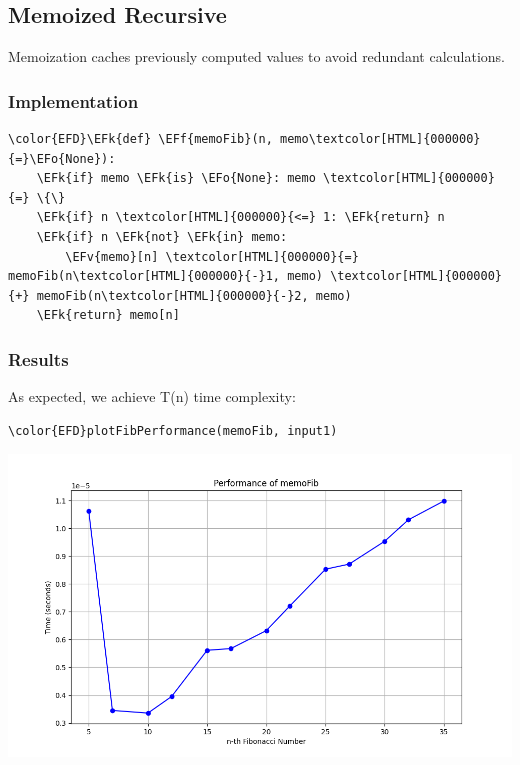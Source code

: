 \documentclass[a4paper,12pt]{article}
\newcommand{\EFk}[1]{\textcolor{EFk}{#1}} %
\newcommand{\EFf}[1]{\textcolor{EFf}{#1}} %
\newcommand{\EFv}[1]{\textcolor{EFv}{#1}} %
\newcommand{\EFo}[1]{\textcolor{EFo}{#1}} %
\begin{document}
\subsection{Memoized Recursive}
\label{sec:org8848356}
Memoization caches previously computed values to avoid redundant calculations.
\subsubsection{Implementation}
\label{sec:org4ffd122}
\begin{Code}
\begin{Verbatim}
\color{EFD}\EFk{def} \EFf{memoFib}(n, memo\textcolor[HTML]{000000}{=}\EFo{None}):
    \EFk{if} memo \EFk{is} \EFo{None}: memo \textcolor[HTML]{000000}{=} \{\}
    \EFk{if} n \textcolor[HTML]{000000}{<=} 1: \EFk{return} n
    \EFk{if} n \EFk{not} \EFk{in} memo:
        \EFv{memo}[n] \textcolor[HTML]{000000}{=} memoFib(n\textcolor[HTML]{000000}{-}1, memo) \textcolor[HTML]{000000}{+} memoFib(n\textcolor[HTML]{000000}{-}2, memo)
    \EFk{return} memo[n]
\end{Verbatim}
\end{Code}
\subsubsection{Results}
\label{sec:org7d2f43a}
As expected, we achieve T(n) time complexity:
\begin{Code}
\begin{Verbatim}
\color{EFD}plotFibPerformance(memoFib, input1)
\end{Verbatim}
\end{Code}

\begin{center}
\includegraphics[width=.9\linewidth]{memoFib.png}
\label{org7880e48}
\end{center}
\end{document}
